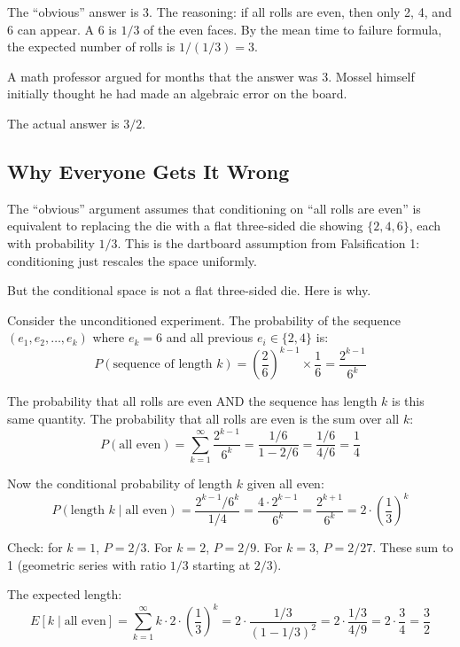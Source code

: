 \documentclass[12pt]{article}
\begin{document}
The ``obvious'' answer is 3. The reasoning: if all rolls are even, then only 2, 4, and 6 can appear. A 6 is $1/3$ of the even faces. By the mean time to failure formula, the expected number of rolls is $1/(1/3) = 3$.

A math professor argued for months that the answer was 3. Mossel himself initially thought he had made an algebraic error on the board.

The actual answer is $3/2$.

\subsection{Why Everyone Gets It Wrong}

The ``obvious'' argument assumes that conditioning on ``all rolls are even'' is equivalent to replacing the die with a flat three-sided die showing $\{2, 4, 6\}$, each with probability $1/3$. This is the dartboard assumption from Falsification 1: conditioning just rescales the space uniformly.

But the conditional space is not a flat three-sided die. Here is why.

Consider the unconditioned experiment. The probability of the sequence $(e_1, e_2, \ldots, e_k)$ where $e_k = 6$ and all previous $e_i \in \{2,4\}$ is:
\begin{equation}
P(\text{sequence of length } k) = \left(\frac{2}{6}\right)^{k-1} \times \frac{1}{6} = \frac{2^{k-1}}{6^k}
\end{equation}

The probability that all rolls are even AND the sequence has length $k$ is this same quantity. The probability that all rolls are even is the sum over all $k$:
\begin{equation}
P(\text{all even}) = \sum_{k=1}^{\infty} \frac{2^{k-1}}{6^k} = \frac{1/6}{1 - 2/6} = \frac{1/6}{4/6} = \frac{1}{4}
\end{equation}

Now the conditional probability of length $k$ given all even:
\begin{equation}
P(\text{length } k \mid \text{all even}) = \frac{2^{k-1}/6^k}{1/4} = \frac{4 \cdot 2^{k-1}}{6^k} = \frac{2^{k+1}}{6^k} = 2 \cdot \left(\frac{1}{3}\right)^k
\end{equation}

Check: for $k = 1$, $P = 2/3$. For $k = 2$, $P = 2/9$. For $k = 3$, $P = 2/27$. These sum to 1 (geometric series with ratio $1/3$ starting at $2/3$).

The expected length:
\begin{equation}
E[k \mid \text{all even}] = \sum_{k=1}^{\infty} k \cdot 2 \cdot \left(\frac{1}{3}\right)^k = 2 \cdot \frac{1/3}{(1-1/3)^2} = 2 \cdot \frac{1/3}{4/9} = 2 \cdot \frac{3}{4} = \frac{3}{2}
\end{equation}
\end{document}
